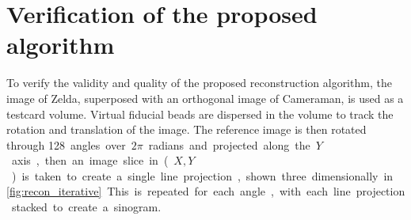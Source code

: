 \documentclass{osa-article}
\begin{document}
\section*{Verification of the proposed algorithm}

To verify the validity and quality of the proposed reconstruction algorithm, the image of Zelda, superposed with an orthogonal image of Cameraman, is used as a testcard volume.
Virtual fiducial beads are dispersed in the volume to track the rotation and translation of the image.%
The reference image is then rotated through \SI{128} angles over \(2\pi \) radians and projected along the \(Y\) axis, then an image slice in (\(X,Y\)) is taken to create a single line projection, shown three dimensionally in \figurename~\ref{fig:recon_iterative}.
This is repeated for each angle,  with each line projection stacked to create a sinogram.%

\end{document}
